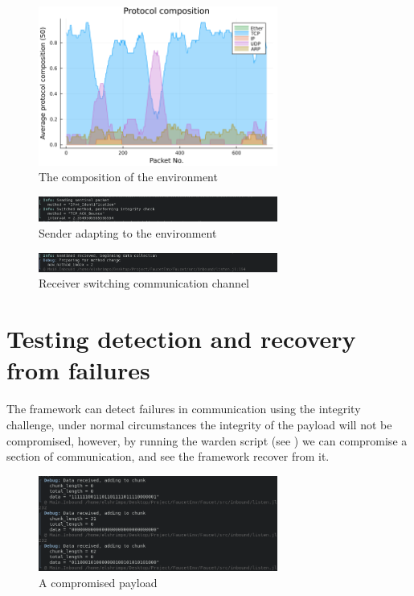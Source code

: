\begin{figure}[h]
    \centering
    \includegraphics[width=0.7\textwidth]{fig/environment_composition.png}
    \caption{The composition of the environment}
    \label{fig:env_composition}
\end{figure}

\begin{figure}[h]
    \centering
    \includegraphics[width=0.7\textwidth]{fig/sender_adapt.png}
    \caption{Sender adapting to the environment}
    \label{fig:send_switch}
\end{figure}

\begin{figure}[h]
    \centering
    \includegraphics[width=0.7\textwidth]{fig/receiver_adapt.png}
    \caption{Receiver switching communication channel}
    \label{fig:recv_switch}
\end{figure}

\section{Testing detection and recovery from failures}
\label{sec:soft_failure_recovery}

The framework can detect failures in communication using the integrity challenge, under normal circumstances the integrity of the payload will not be compromised, however, by running the warden script (see ) we can compromise a section of communication, and see the framework recover from it.

\begin{figure}[h]
    \centering
    \includegraphics[width=0.7\textwidth]{fig/poison_tcp.png}
    \caption{A compromised payload}
    \label{fig:poison_tcp}
\end{figure}

